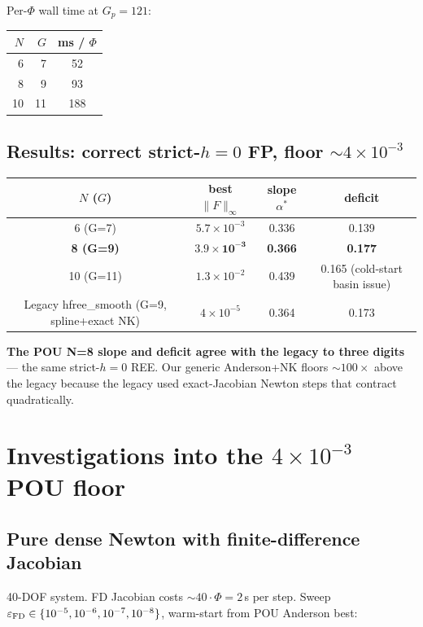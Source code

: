 \documentclass[11pt]{article}
\begin{document}
Per-$\Phi$ wall time at $G_p{=}121$:
\begin{center}
\begin{tabular}{rrc}
\toprule
$N$ & $G$ & ms / $\Phi$ \\
\midrule
6  & 7  & 52  \\
8  & 9  & 93  \\
10 & 11 & 188 \\
\bottomrule
\end{tabular}
\end{center}

\subsection{Results: correct strict-$h{=}0$ FP, floor $\sim 4\!\times\!10^{-3}$}

\begin{center}
\begin{tabular}{cccc}
\toprule
$N$ ($G$) & best $\|F\|_\infty$ & slope $\alpha^*$ & deficit \\
\midrule
6  (G=7)  & $5.7\!\times\!10^{-3}$ & 0.336 & 0.139 \\
\textbf{8  (G=9)}  & $\mathbf{3.9\!\times\!10^{-3}}$ & \textbf{0.366} & \textbf{0.177} \\
10 (G=11) & $1.3\!\times\!10^{-2}$ & 0.439 & 0.165 (cold-start basin issue) \\
\midrule
Legacy hfree\_smooth (G=9, spline+exact NK) & $4\!\times\!10^{-5}$ & 0.364 & 0.173 \\
\bottomrule
\end{tabular}
\end{center}

\textbf{The POU N=8 slope and deficit agree with the legacy to three
digits} --- the same strict-$h{=}0$ REE. Our generic Anderson+NK
floors $\sim 100\times$ above the legacy because the legacy used
exact-Jacobian Newton steps that contract quadratically.

\section{Investigations into the $4\!\times\!10^{-3}$ POU floor}

\subsection{Pure dense Newton with finite-difference Jacobian}

40-DOF system. FD Jacobian costs $\sim 40\!\cdot\!\Phi = 2$\,s per step.
Sweep $\varepsilon_{\rm FD} \in \{10^{-5}, 10^{-6}, 10^{-7}, 10^{-8}\}$,
warm-start from POU Anderson best:
\end{document}
